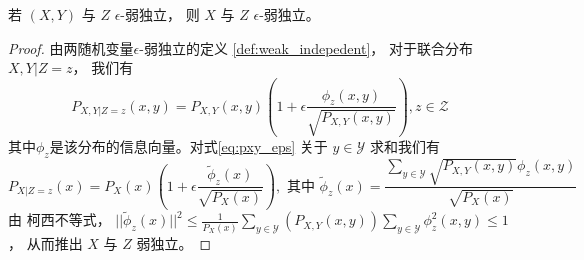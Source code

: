 \begin{lemma}\label{lem:xyz}
	若 $(X,Y)$ 与 $Z$ $\epsilon$-弱独立，
  则 $X$ 与 $Z$ $\epsilon$-弱独立。
\end{lemma}
\begin{proof}
	由两随机变量$\epsilon$-弱独立的定义 \ref{def:weak_indepedent}，
  对于联合分布$X,Y|Z=z$，
  我们有
	\begin{equation}\label{eq:pxy_eps}
	P_{X,Y|Z=z}(x,y) = P_{X,Y}(x,y)\left(1+\epsilon \frac{\phi_z(x,y)}{\sqrt{P_{X,Y}(x,y)}}
  \right), z \in \mathcal{Z}
	\end{equation}
	其中$\phi_z$是该分布的信息向量。对式\eqref{eq:pxy_eps} 关于 $y\in \mathcal{Y}$ 求和我们有
	\begin{equation}
	P_{X|Z=z}(x) = P_X(x)\left(1+\epsilon\frac{\tilde{\phi}_z(x)}{\sqrt{P_X(x)}} \right),
	\textrm{ 其中 } \tilde{\phi}_z(x) = \frac{\sum_{y\in \mathcal{Y}} \sqrt{P_{X,Y}(x,y) }\phi_z(x,y)}{\sqrt{P_X(x)}}
	\end{equation}
	由 柯西不等式，
  $||\tilde{\phi}_z(x)||^2 \leq \frac{1}{P_X(x)}
	\sum_{y\in \mathcal{Y}}(P_{X,Y}(x,y))
	\sum_{y\in \mathcal{Y}} \phi_z^2(x,y) \leq 1
	$，
	从而推出 $X$  与 $Z$ 弱独立。
\end{proof}
